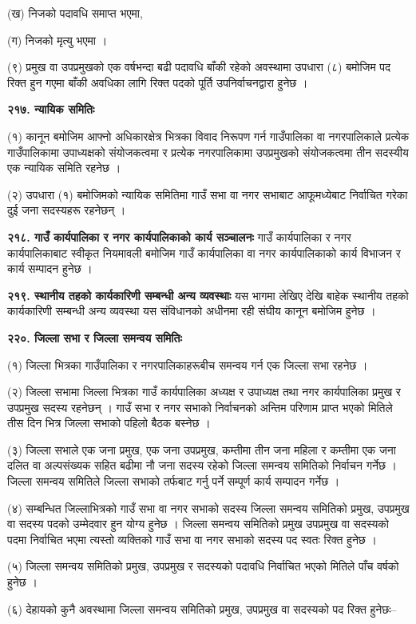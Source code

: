 (ख) निजको पदावधि समाप्त भएमा,

(ग) निजको मृत्यु भएमा ।

(९) प्रमुख वा उपप्रमुखको एक वर्षभन्दा बढी पदावधि बाँकी रहेको अवस्थामा उपधारा (८) बमोजिम पद रिक्त हुन गएमा बाँकी अवधिका लागि रिक्त पदको पूर्ति उपनिर्वाचनद्वारा हुनेछ ।

\textbf{२१७. न्यायिक समितिः}

(१) कानून बमोजिम आफ्नो अधिकारक्षेत्र भित्रका विवाद निरूपण गर्न गाउँपालिका वा नगरपालिकाले प्रत्येक गाउँपालिकामा उपाध्यक्षको संयोजकत्वमा र प्रत्येक नगरपालिकामा उपप्रमुखको संयोजकत्वमा तीन सदस्यीय एक न्यायिक समिति रहनेछ ।

(२) उपधारा (१) बमोजिमको न्यायिक समितिमा गाउँ सभा वा नगर सभाबाट आफूमध्येबाट निर्वाचित गरेका दुई जना सदस्यहरू रहनेछन् ।

\textbf{२१८. गाउँ कार्यपालिका र नगर कार्यपालिकाको कार्य सञ्चालनः} गाउँ कार्यपालिका र नगर कार्यपालिकाबाट स्वीकृत नियमावली बमोजिम गाउँ कार्यपालिका वा नगर कार्यपालिकाको कार्य विभाजन र कार्य सम्पादन हुनेछ ।

\textbf{२१९. स्थानीय तहको कार्यकारिणी सम्बन्धी अन्य व्यवस्थाः} यस भागमा लेखिए देखि बाहेक स्थानीय तहको कार्यकारिणी सम्बन्धी अन्य व्यवस्था यस संविधानको अधीनमा रही संघीय कानून बमोजिम हुनेछ ।

\textbf{२२०. जिल्ला सभा र जिल्ला समन्वय समितिः}

(१) जिल्ला भित्रका गाउँपालिका र नगरपालिकाहरूबीच समन्वय गर्न एक जिल्ला सभा रहनेछ ।

(२) जिल्ला सभामा जिल्ला भित्रका गाउँ कार्यपालिका अध्यक्ष र उपाध्यक्ष तथा नगर कार्यपालिका प्रमुख र उपप्रमुख सदस्य रहनेछन् । गाउँ
सभा र नगर सभाको निर्वाचनको अन्तिम परिणाम प्राप्त भएको मितिले तीस दिन भित्र जिल्ला सभाको पहिलो बैठक बस्नेछ ।

(३) जिल्ला सभाले एक जना प्रमुख, एक जना उपप्रमुख, कम्तीमा तीन जना महिला र कम्तीमा एक जना दलित वा अल्पसंख्यक सहित बढीमा नौ जना सदस्य रहेको जिल्ला समन्वय समितिको निर्वाचन गर्नेछ । जिल्ला समन्वय समितिले जिल्ला सभाको तर्फबाट गर्नु पर्ने सम्पूर्ण कार्य सम्पादन गर्नेछ ।

(४) सम्बन्धित जिल्लाभित्रको गाउँ सभा वा नगर सभाको सदस्य जिल्ला समन्वय समितिको प्रमुख, उपप्रमुख वा सदस्य पदको उम्मेदवार हुन योग्य हुनेछ । जिल्ला समन्वय समितिको प्रमुख उपप्रमुख वा सदस्यको पदमा निर्वाचित भएमा त्यस्तो व्यक्तिको गाउँ सभा वा नगर सभाको सदस्य पद स्वतः रिक्त हुनेछ ।

(५) जिल्ला समन्वय समितिको प्रमुख, उपप्रमुख र सदस्यको पदावधि निर्वाचित भएको मितिले पाँच वर्षको हुनेछ ।

(६) देहायको कुनै अवस्थामा जिल्ला समन्वय समितिको प्रमुख, उपप्रमुख वा सदस्यको पद रिक्त हुनेछः–

